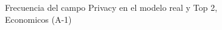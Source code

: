 \begin{figure}[H]
    \centering
    
    \caption{Frecuencia del campo Privacy en el modelo real y Top 2, Economicos (A-1)}
    \label{frecuency-Privacy-top2}
\end{figure}